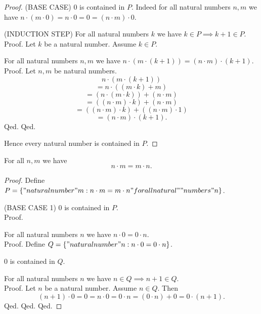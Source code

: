 \documentclass[../../natural-numbers.ftl.tex]{subfiles}
\begin{document}
\begin{forthel}
\begin{proof}
      (BASE CASE) $0$ is contained in $P$.
      Indeed for all natural numbers $n,m$ we have $n \cdot (m \cdot 0) = n \cdot 0 = 0 = (n \cdot m) \cdot 0$.

      (INDUCTION STEP) For all natural numbers $k$ we have $k \in P \implies k + 1 \in P$. \\
      Proof.
        Let $k$ be a natural number.
        Assume $k \in P$.

        For all natural numbers $n,m$ we have $n \cdot (m \cdot (k + 1)) = (n \cdot m) \cdot (k + 1)$. \\
        Proof.
          Let $n,m$ be natural numbers.
          $$n \cdot (m \cdot (k + 1))$$
          $$= n \cdot ((m \cdot k) + m)$$
          $$= (n \cdot (m \cdot k)) + (n \cdot m)$$
          $$= ((n \cdot m) \cdot k) + (n \cdot m)$$
          $$= ((n \cdot m) \cdot k) + ((n \cdot m) \cdot 1)$$
          $$= (n \cdot m) \cdot (k + 1).$$
        Qed.
      Qed.

      Hence every natural number is contained in $P$.
    \end{proof}


    \begin{proposition}[NN 01 03 850937]
      For all $n,m$ we have
      $$n \cdot m = m \cdot n.$$
    \end{proposition}
    \begin{proof}
      Define $P = \{ "natural number" m : n \cdot m = m \cdot n "for all natural"\\"numbers" n \}$.

      (BASE CASE 1) $0$ is contained in $P$. \\
      Proof.

        For all natural numbers $n$ we have $n \cdot 0 = 0 \cdot n$. \\
        Proof.
          Define $Q = \{ "natural number" n : n \cdot 0 = 0 \cdot n \}$.

          $0$ is contained in $Q$.

          For all natural numbers $n$ we have $n \in Q \implies n + 1 \in Q$. \\
          Proof.
            Let $n$ be a natural number.
            Assume $n \in Q$.
            Then
            $$
              (n + 1) \cdot 0
            = 0                 %
            = n \cdot 0         %
            = 0 \cdot n         %
            = (0 \cdot n) + 0   %
            = 0 \cdot (n + 1).  %
            $$
          Qed.
        Qed.
      Qed.


\end{proof}
\end{forthel}
\end{document}
